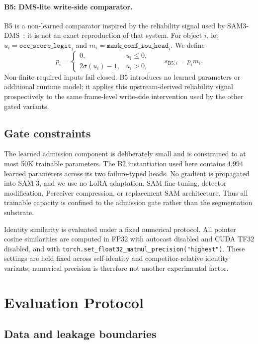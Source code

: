\documentclass[10pt,twocolumn,letterpaper]{article}
\begin{document}
\paragraph{B5: DMS-lite write-side comparator.}
B5 is a non-learned comparator inspired by the reliability signal used by
SAM3-DMS~\cite{SAM3-DMS}; it is not an exact reproduction of that system.
For object \(i\), let
\(u_i=\texttt{occ\_score\_logit}_i\) and
\(m_i=\texttt{mask\_conf\_iou\_head}_i\).  We define
\[
p_i =
\begin{cases}
0, & u_i\leq 0,\\
2\sigma(u_i)-1, & u_i>0,
\end{cases}
\qquad
s_{\mathrm{B5},i}=p_i m_i.
\]
Non-finite required inputs fail closed.  B5 introduces no learned parameters
or additional runtime model; it applies this upstream-derived reliability
signal prospectively to the same frame-level write-side intervention used by
the other gated variants.

\subsection{Gate constraints}

The learned admission component is deliberately small and is constrained to
at most 50K trainable parameters.  The B2 instantiation used here contains
4,994 learned parameters across its two failure-typed heads.  No gradient is
propagated into SAM 3, and we use no LoRA adaptation, SAM fine-tuning,
detector modification, Perceiver compression, or replacement SAM
architecture.  Thus all trainable capacity is confined to the admission
gate rather than the segmentation substrate.

Identity similarity is evaluated under a fixed numerical protocol.  All
pointer cosine similarities are computed in FP32 with autocast disabled and
CUDA TF32 disabled, and with
\texttt{torch.set\_float32\_matmul\_precision("highest")}.  These settings
are held fixed across self-identity and competitor-relative identity
variants; numerical precision is therefore not another experimental factor.

\section{Evaluation Protocol}
\label{sec:protocol}

\subsection{Data and leakage boundaries}
\end{document}
